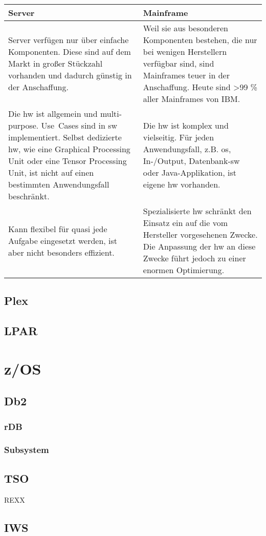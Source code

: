 \begin{table}
    \begin{tabularx}{\textwidth}{|X|X|}
        \hline
        \textbf{Server} & \textbf{Mainframe} \\
        \hline
        Server verfügen nur über einfache Komponenten. Diese sind auf dem Markt in großer Stückzahl vorhanden und dadurch günstig in der Anschaffung.
        &
        Weil sie aus besonderen Komponenten bestehen, die nur bei wenigen Herstellern verfügbar sind, sind Mainframes teuer in der Anschaffung. Heute sind >99 \% aller Mainframes von IBM.
        \\
        \hline
        Die \ac{hw} ist allgemein und multi-purpose. \mbox{Use Cases} sind in \ac{sw} implementiert. Selbst dedizierte \ac{hw}, wie eine Graphical Processing Unit oder eine Tensor Processing Unit, ist nicht auf einen bestimmten Anwendungsfall beschränkt.
        &
        Die \ac{hw} ist komplex und vielseitig. Für jeden Anwendungsfall, z.B. \ac{os}, In-/Output, Datenbank-\ac{sw} oder Java-Applikation, ist eigene \ac{hw} vorhanden.
        \\
        \hline
        Kann flexibel für quasi jede Aufgabe eingesetzt werden, ist aber nicht besonders effizient.
        &
        Spezialisierte \ac{hw} schränkt den Einsatz ein auf die vom Hersteller vorgesehenen Zwecke. Die Anpassung der \ac{hw} an diese Zwecke führt jedoch zu einer enormen Optimierung.
        \\
        \hline
    \end{tabularx}
\end{table}

\subsection{Plex}

\subsection{LPAR}

\section{z/OS}

\subsection{Db2}

\subsubsection{rDB}
\subsubsection{Subsystem}

\subsection{TSO}
REXX

\subsection{IWS}